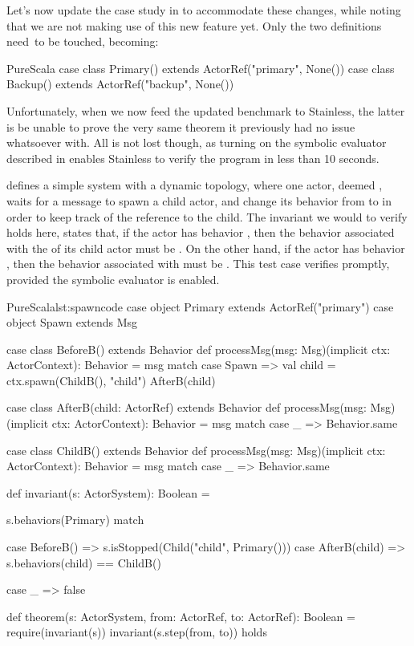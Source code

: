 Let's now update the case study in  to accommodate 
these changes, while noting that we are not making use of this new feature yet. Only 
the two \ActorRef definitions need to be touched, becoming:

\begin{ShortCode}{PureScala}
case class Primary() extends ActorRef("primary", None())
case class Backup()  extends ActorRef("backup", None())
\end{ShortCode}

Unfortunately, when we now feed the updated benchmark to Stainless, the latter is be 
unable to prove the very same theorem it previously had no issue whatsoever with.
All is not lost though, as turning on the symbolic evaluator described in
 enables Stainless to verify the program in less than 10 seconds.

 defines a simple system with a dynamic topology, where one actor, deemed , waits for a  message to spawn a child actor, and change its behavior from  to  in order to keep track of the reference to the child. The invariant we would to verify holds here, states that, if the  actor has behavior , then the behavior associated with the \ActorRef of its child actor must be . On the other hand, if the  actor has behavior , then the behavior associated with  must be . This test case verifies promptly, provided the symbolic evaluator is enabled.

\begin{Code}{PureScala}{lst:spawncode}{}
case object Primary extends ActorRef("primary")
case object Spawn extends Msg

case class BeforeB() extends Behavior {
  def processMsg(msg: Msg)(implicit ctx: ActorContext): Behavior = msg match {
    case Spawn =>
      val child = ctx.spawn(ChildB(), "child")
      AfterB(child)
  }
}

case class AfterB(child: ActorRef) extends Behavior {
  def processMsg(msg: Msg)(implicit ctx: ActorContext): Behavior = msg match {
    case _ => Behavior.same
  }
}

case class ChildB() extends Behavior {
  def processMsg(msg: Msg)(implicit ctx: ActorContext): Behavior = msg match {
    case _ => Behavior.same
  }
}

def invariant(s: ActorSystem): Boolean = {
  s.behaviors(Primary) match {
    case BeforeB() =>
      s.isStopped(Child("child", Primary()))
    case AfterB(child) =>
      s.behaviors(child) == ChildB()

    case _ => false
  }
}

def theorem(s: ActorSystem, from: ActorRef, to: ActorRef): Boolean = {
  require(invariant(s))
  invariant(s.step(from, to))
} holds
\end{Code}

